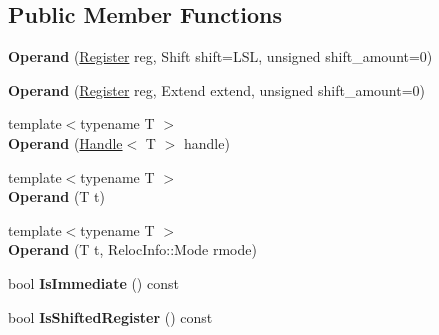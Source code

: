 \subsection*{Public Member Functions}
\begin{DoxyCompactItemize}
\item 
{\bfseries Operand} (\hyperlink{structv8_1_1internal_1_1_register}{Register} reg, Shift shift=L\+SL, unsigned shift\+\_\+amount=0)\hypertarget{classv8_1_1internal_1_1_operand_a1af963dd843b63c0c2aaa9ccd339c47f}{}\label{classv8_1_1internal_1_1_operand_a1af963dd843b63c0c2aaa9ccd339c47f}

\item 
{\bfseries Operand} (\hyperlink{structv8_1_1internal_1_1_register}{Register} reg, Extend extend, unsigned shift\+\_\+amount=0)\hypertarget{classv8_1_1internal_1_1_operand_aae672cf521d2681ac927432410638373}{}\label{classv8_1_1internal_1_1_operand_aae672cf521d2681ac927432410638373}

\item 
{\footnotesize template$<$typename T $>$ }\\{\bfseries Operand} (\hyperlink{classv8_1_1internal_1_1_handle}{Handle}$<$ T $>$ handle)\hypertarget{classv8_1_1internal_1_1_operand_a16973e53cbf4acd5dec14b1c2c58410f}{}\label{classv8_1_1internal_1_1_operand_a16973e53cbf4acd5dec14b1c2c58410f}

\item 
{\footnotesize template$<$typename T $>$ }\\{\bfseries Operand} (T t)\hypertarget{classv8_1_1internal_1_1_operand_abfdd57ab46b4569f2262434f10a8ee5b}{}\label{classv8_1_1internal_1_1_operand_abfdd57ab46b4569f2262434f10a8ee5b}

\item 
{\footnotesize template$<$typename T $>$ }\\{\bfseries Operand} (T t, Reloc\+Info\+::\+Mode rmode)\hypertarget{classv8_1_1internal_1_1_operand_a9d61addaaab7feba8f2b3af60a703fe7}{}\label{classv8_1_1internal_1_1_operand_a9d61addaaab7feba8f2b3af60a703fe7}

\item 
bool {\bfseries Is\+Immediate} () const \hypertarget{classv8_1_1internal_1_1_operand_ad4fbcd10cbdee2de518f1b962cc8be4a}{}\label{classv8_1_1internal_1_1_operand_ad4fbcd10cbdee2de518f1b962cc8be4a}

\item 
bool {\bfseries Is\+Shifted\+Register} () const \hypertarget{classv8_1_1internal_1_1_operand_ab61c63caad79835f6e1a3b4c8204f5af}{}\label{classv8_1_1internal_1_1_operand_ab61c63caad79835f6e1a3b4c8204f5af}


\end{DoxyCompactItemize}
